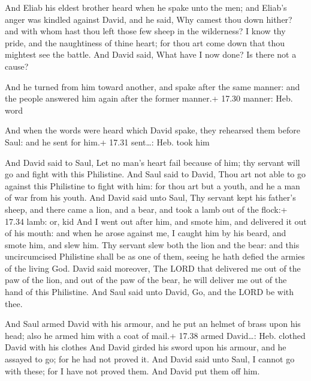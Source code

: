  And Eliab his eldest brother heard when he spake unto
the men; and Eliab's anger was kindled against David, and he said, Why
camest thou down hither? and with whom hast thou left those few sheep in
the wilderness? I know thy pride, and the naughtiness of thine heart;
for thou art come down that thou mightest see the battle. 
And David said, What have I now done? Is there not a cause?

 And he turned from him toward another, and spake after
the same manner: and the people answered him again after the former
manner.+ 17.30 manner: Heb. word

 And when the words were heard which David spake, they
rehearsed them before Saul: and he sent for him.+ 17.31 sent\ldots: Heb.
took him

 And David said to Saul, Let no man's heart fail because
of him; thy servant will go and fight with this Philistine.
 And Saul said to David, Thou art not able to go against
this Philistine to fight with him: for thou art but a youth, and he a
man of war from his youth.  And David said unto Saul, Thy
servant kept his father's sheep, and there came a lion, and a bear, and
took a lamb out of the flock:+ 17.34 lamb: or, kid  And I
went out after him, and smote him, and delivered it out of his mouth:
and when he arose against me, I caught him by his beard, and smote him,
and slew him.  Thy servant slew both the lion and the bear:
and this uncircumcised Philistine shall be as one of them, seeing he
hath defied the armies of the living God.  David said
moreover, The LORD that delivered me out of the paw of the lion, and out
of the paw of the bear, he will deliver me out of the hand of this
Philistine. And Saul said unto David, Go, and the LORD be with thee.

 And Saul armed David with his armour, and he put an
helmet of brass upon his head; also he armed him with a coat of mail.+
17.38 armed David\ldots: Heb. clothed David with his clothes
 And David girded his sword upon his armour, and he assayed
to go; for he had not proved it. And David said unto Saul, I cannot go
with these; for I have not proved them. And David put them off him.

